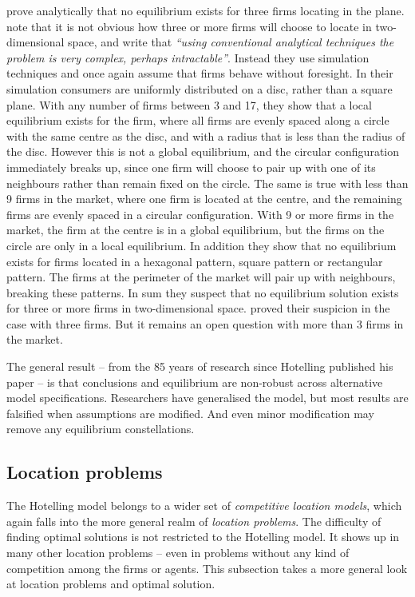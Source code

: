 \documentclass[preprint, 12pt]{elsarticle}
\begin{document}
\citet{Shaked_1975} prove analytically that no equilibrium exists for three firms locating in the plane. \citet[p.~40]{Eaton_Lipsey_1975} note that it is not obvious how three or more firms will choose to locate in two-dimensional space, and write that \emph{``using conventional analytical techniques the problem is very complex, perhaps intractable''}. Instead they use simulation techniques and once again assume that firms behave without foresight. In their simulation consumers are uniformly distributed on a disc, rather than a square plane. With any number of firms between 3 and 17, they show that a local equilibrium exists for the firm, where all firms are evenly spaced along a circle with the same centre as the disc, and with a radius that is less than the radius of the disc. However this is not a global equilibrium, and the circular configuration immediately breaks up, since one firm will choose to pair up with one of its neighbours rather than remain fixed on the circle. The same is true with less than 9 firms in the market, where one firm is located at the centre, and the remaining firms are evenly spaced in a circular configuration. With 9 or more firms in the market, the firm at the centre is in a global equilibrium, but the firms on the circle are only in a local equilibrium. In addition they show that no equilibrium exists for firms located in a hexagonal pattern, square pattern or rectangular pattern. The firms at the perimeter of the market will pair up with neighbours, breaking these patterns. In sum they suspect that no equilibrium solution exists for three or more firms in two-dimensional space. \citet{Shaked_1975} proved their suspicion in the case with three firms. But it remains an open question with more than 3 firms in the market.

The general result -- from the 85 years of research since Hotelling published his paper -- is that conclusions and equilibrium are non-robust across alternative model specifications. Researchers have generalised the model, but most results are falsified when assumptions are modified. And even minor modification may remove any equilibrium constellations.

\subsection{Location problems}

The Hotelling model belongs to a wider set of \emph{competitive location models}, which again falls into the more general realm of \emph{location problems}. The difficulty of finding optimal solutions is not restricted to the Hotelling model. It shows up in many other location problems -- even in problems without any kind of competition among the firms or agents. This subsection takes a more general look at location problems and optimal solution.
\end{document}
